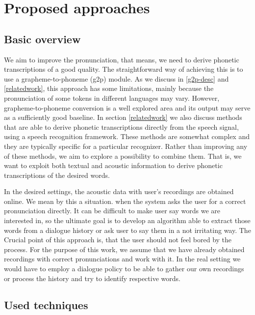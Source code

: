 \chapter{Proposed approaches}
\section{Basic overview}
We aim to improve the pronunciation, that means, we need to derive phonetic transcriptions of a good quality. The straightforward way of achieving this is to use a grapheme-to-phoneme (g2p) module. As we discuss in \ref{g2p-desc} and \ref{relatedwork}, this approach has some limitations, mainly because the pronunciation of some tokens in different languages may vary. However, grapheme-to-phoneme conversion is a well explored area and its output may serve as a sufficiently good baseline.
In section \ref{relatedwork} we also discuss methods that are able to derive phonetic transcriptions directly from the speech signal, using a speech recognition framework. These methods are somewhat complex and they are typically specific for a particular recognizer. Rather than improving any of these methods, we aim to explore a possibility to combine them. That is, we want to exploit both textual and acoustic information to derive phonetic transcriptions of the desired words.
\par
In the desired settings, the acoustic data with user's recordings are obtained online.
We mean by this a situation. when the system asks the user for a correct pronunciation directly.
It can be difficult to make user say words we are interested in, so the ultimate goal is to develop an algorithm able to extract those words from a dialogue history or ask user to say them in a not irritating way.
The Crucial point of this approach is, that the user should not feel bored by the process. For the purpose of this work, we assume that we have already obtained recordings with correct pronunciations and work with it.
In the real setting we would have to employ a dialogue policy to be able to gather our own recordings or process the history and try to identify respective words.
\section{Used techniques}
